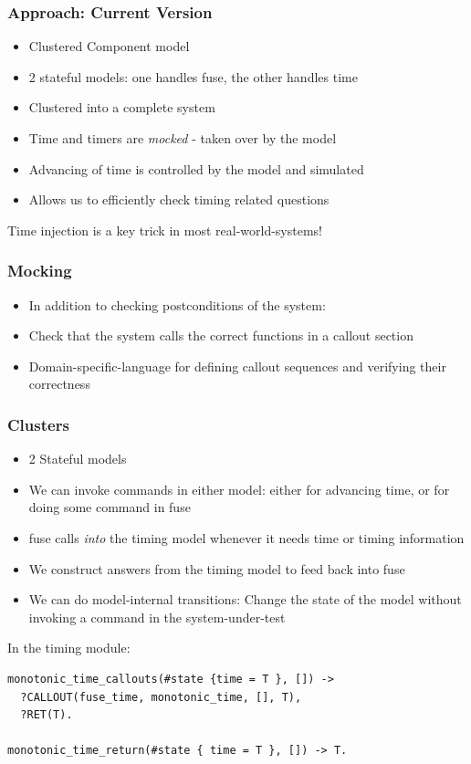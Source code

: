 \documentclass[lualatex]{beamer}
\begin{document}
\begin{frame}
  \frametitle{Approach: Current Version}
  \begin{itemize}
  \item Clustered Component model
  \item 2 stateful models: one handles fuse, the other handles time
  \item Clustered into a complete system
  \item Time and timers are \emph{mocked} - taken over by the model
  \item Advancing of time is controlled by the model and simulated
  \item Allows us to efficiently check timing related questions
  \end{itemize}
  Time injection is a key trick in most real-world-systems!
\end{frame}

\begin{frame}
  \frametitle{Mocking}
  \begin{itemize}
  \item In addition to checking postconditions of the system:
  \item Check that the system calls the correct functions in a callout
    section
  \item Domain-specific-language for defining callout sequences and
    verifying their correctness
  \end{itemize}
\end{frame}

\begin{frame}
  \frametitle{Clusters}
  \begin{itemize}
  \item 2 Stateful models
  \item We can invoke commands in either model: either for advancing
    time, or for doing some command in fuse
  \item fuse calls \emph{into} the timing model whenever it needs time
    or timing information
  \item We construct answers from the timing model to feed back into
    fuse
  \item We can do model-internal transitions: Change the state of the
    model without invoking a command in the system-under-test
  \end{itemize}
\end{frame}

  
\begin{frame}[fragile]
  In the timing module:
  \begin{verbatim}
monotonic_time_callouts(#state {time = T }, []) ->
  ?CALLOUT(fuse_time, monotonic_time, [], T),
  ?RET(T).

monotonic_time_return(#state { time = T }, []) -> T.
  \end{verbatim}
\end{frame}
\end{document}
